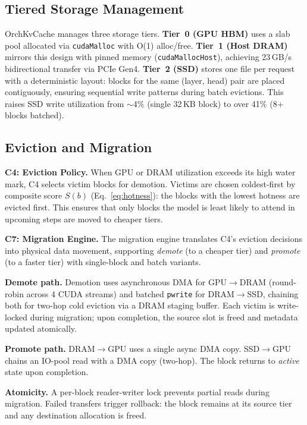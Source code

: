 \documentclass[conference]{IEEEtran}
\begin{document}
\subsection{Tiered Storage Management}
\label{sec:tiered-storage}

OrchKvCache manages three storage tiers.
\textbf{Tier~0 (GPU HBM)} uses a slab pool allocated via \texttt{cudaMalloc} with O(1) alloc/free.
\textbf{Tier~1 (Host DRAM)} mirrors this design with pinned memory (\texttt{cudaMallocHost}), achieving 23\,GB/s bidirectional transfer via PCIe Gen4.
\textbf{Tier~2 (SSD)} stores one file per request with a deterministic layout: blocks for the same (layer, head) pair are placed contiguously, ensuring sequential write patterns during batch evictions. This raises SSD write utilization from ${\sim}$4\% (single 32\,KB block) to over 41\% (8+ blocks batched).

\subsection{Eviction and Migration}
\label{sec:migration}

\textbf{C4: Eviction Policy.} When GPU or DRAM utilization exceeds its high water mark, C4 selects victim blocks for demotion. Victims are chosen coldest-first by composite score $S(b)$ (Eq.~\ref{eq:hotness}): the blocks with the lowest hotness are evicted first. This ensures that only blocks the model is least likely to attend in upcoming steps are moved to cheaper tiers.

\textbf{C7: Migration Engine.} The migration engine translates C4's eviction decisions into physical data movement, supporting \emph{demote} (to a cheaper tier) and \emph{promote} (to a faster tier) with single-block and batch variants.

\textbf{Demote path.} Demotion uses asynchronous DMA for GPU$\to$DRAM (round-robin across 4 CUDA streams) and batched \texttt{pwrite} for DRAM$\to$SSD, chaining both for two-hop cold eviction via a DRAM staging buffer. Each victim is write-locked during migration; upon completion, the source slot is freed and metadata updated atomically.

\textbf{Promote path.} DRAM$\to$GPU uses a single async DMA copy. SSD$\to$GPU chains an IO-pool read with a DMA copy (two-hop). The block returns to \emph{active} state upon completion.

\textbf{Atomicity.} A per-block reader-writer lock prevents partial reads during migration. Failed transfers trigger rollback: the block remains at its source tier and any destination allocation is freed.
\end{document}
